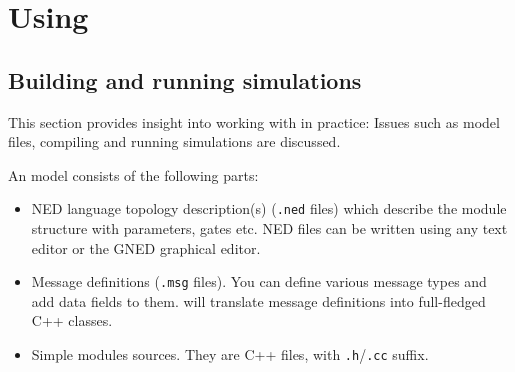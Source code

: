%
%
%
%
%
%
%
%
%


\section{Using {\opp}}


\subsection{Building and running simulations}

This section provides insight into working with {\opp} in practice:
Issues such as model files, compiling and running simulations are
discussed.

An {\opp} model consists of the following parts:
\begin{itemize}
  \item{NED language topology description(s) (\texttt{.ned} files)
    which describe the module structure with parameters, gates etc.
    NED files can be written using any text editor or the
    GNED graphical editor.}
  \item{Message definitions (\texttt{.msg} files). You can define various message
    types and add data fields to them. {\opp} will translate message definitions
    into full-fledged C++ classes.}
  \item{Simple modules sources. They are C++ files, with \texttt{.h}/\texttt{.cc} suffix.}
\end{itemize}

